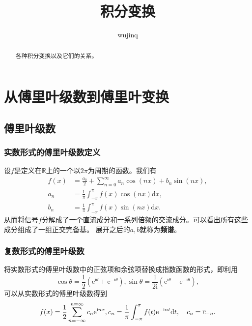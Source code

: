 \documentclass[UTF8]{ctexart}
\title{积分变换}
\author{wujinq}
\newcommand*{\ee}{\mathrm{e}}
\begin{document}
\maketitle

\begin{abstract}
    各种积分变换以及它们的关系。
\end{abstract}

\hypertarget{sec:fourier}{%
\section{从傅里叶级数到傅里叶变换}\label{sec:fourier}}

\hypertarget{sec:fourier-series}{%
\subsection{傅里叶级数}\label{sec:fourier-series}}

\hypertarget{sec:fourier-series-real}{%
\subsubsection{实数形式的傅里叶级数定义}\label{sec:fourier-series-real}}

设$f$是定义在$\mathbb{R}$上的一个以$2\pi$为周期的函数。我们有
\begin{equation}
    \begin{aligned}
        f(x) &= \frac{a_0}{2} + \sum_{n=0}^{\infty} a_n \cos (nx) + b_n \sin(nx), \\
        a_n &= \frac{1}{\pi} \int_{-\pi}^{\pi} f(x) \cos (nx) \mathrm{d}x, \\
        b_n &=  \frac{1}{\pi} \int_{-\pi}^{\pi} f(x) \sin (nx) \mathrm{d}x.
        \label{eq:fourier-series-2pi}
    \end{aligned}
\end{equation}
从而将信号$f$分解成了一个直流成分和一系列倍频的交流成分。可以看出所有这些成分组成了一组正交完备基。
展开之后的$a, b$就称为\textbf{频谱}。

\subsubsection{复数形式的傅里叶级数}

将实数形式的傅里叶级数中的正弦项和余弦项替换成指数函数的形式，即利用
\[
\cos \theta = \frac{1}{2} (\ee^{\mathrm{i} \theta} + \ee^{ - \mathrm{i} \theta}),
\sin \theta = \frac{1}{2 \mathrm{i}} (\ee^{\mathrm{i} \theta} - \ee^{ - \mathrm{i} \theta}),
\]
可以从实数形式的傅里叶级数得到
\[
f(x) = \frac{1}{2} \sum_{n = -\infty}^{n = \infty} c_n \ee^{\mathrm{i}n x}, \\
c_n = \frac{1}{\pi}\int_{-\pi}^{\pi} f(t) \ee^{-\mathrm{i}nt} \mathrm{d}t, \quad c_n = \overline{c}_{-n}.
\]
\end{document}
